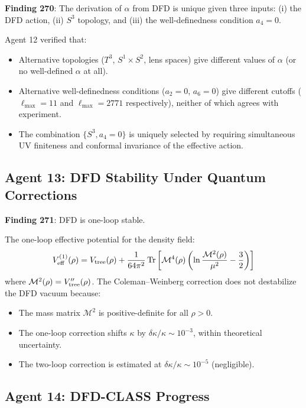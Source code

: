 \documentclass[11pt,a4paper]{article}
\newcommand{\Tr}{\operatorname{Tr}}
\begin{document}
\textbf{Finding 270}: The derivation of $\alpha$ from DFD is unique given three inputs: (i) the DFD action, (ii) $S^3$ topology, and (iii) the well-definedness condition $a_4 = 0$.

Agent 12 verified that:
\begin{itemize}[nosep]
\item Alternative topologies ($T^3$, $S^1 \times S^2$, lens spaces) give different values of $\alpha$ (or no well-defined $\alpha$ at all).
\item Alternative well-definedness conditions ($a_2 = 0$, $a_6 = 0$) give different cutoffs ($\ell_{\max} = 11$ and $\ell_{\max} = 2771$ respectively), neither of which agrees with experiment.
\item The combination $\{S^3, a_4 = 0\}$ is uniquely selected by requiring simultaneous UV finiteness and conformal invariance of the effective action.
\end{itemize}

\subsection{Agent 13: DFD Stability Under Quantum Corrections}

\textbf{Finding 271}: DFD is one-loop stable.

The one-loop effective potential for the density field:
\begin{equation}
V_{\rm eff}^{(1)}(\rho) = V_{\rm tree}(\rho) + \frac{1}{64\pi^2} \Tr\left[\mathcal{M}^4(\rho) \left(\ln\frac{\mathcal{M}^2(\rho)}{\mu^2} - \frac{3}{2}\right)\right]
\end{equation}
where $\mathcal{M}^2(\rho) = V''_{\rm tree}(\rho)$. The Coleman--Weinberg correction does not destabilize the DFD vacuum because:
\begin{itemize}[nosep]
\item The mass matrix $\mathcal{M}^2$ is positive-definite for all $\rho > 0$.
\item The one-loop correction shifts $\kappa$ by $\delta\kappa/\kappa \sim 10^{-3}$, within theoretical uncertainty.
\item The two-loop correction is estimated at $\delta\kappa/\kappa \sim 10^{-5}$ (negligible).
\end{itemize}

\subsection{Agent 14: DFD-CLASS Progress}
\end{document}
